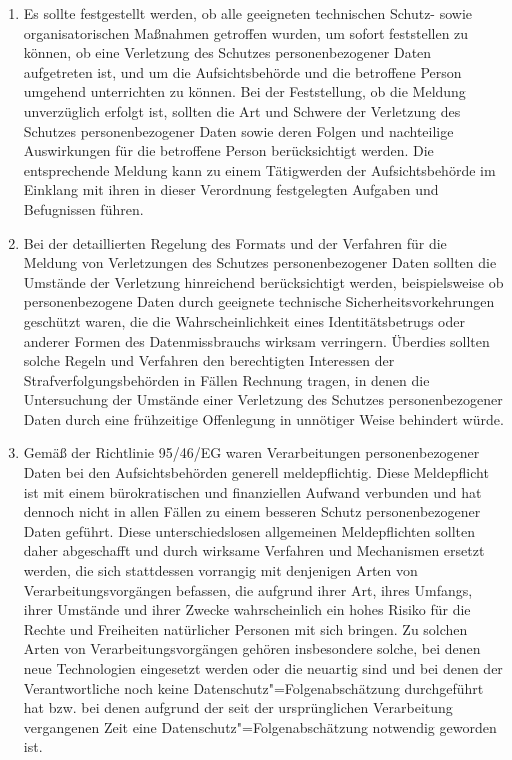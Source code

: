 \begin{enumerate}

   \item Es sollte festgestellt werden, ob alle geeigneten technischen Schutz- sowie organisatorischen Maßnahmen
    getroffen wurden, um sofort feststellen zu können, ob eine Verletzung des Schutzes personenbezogener Daten
    aufgetreten ist, und um die Aufsichtsbehörde und die betroffene Person umgehend unterrichten zu können. Bei der
    Feststellung, ob die Meldung unverzüglich erfolgt ist, sollten die Art und Schwere der Verletzung des Schutzes
    personenbezogener Daten sowie deren Folgen und nachteilige Auswirkungen für die betroffene Person berücksichtigt
    werden. Die entsprechende Meldung kann zu einem Tätigwerden der Aufsichtsbehörde im Einklang mit ihren in dieser
    Verordnung festgelegten Aufgaben und Befugnissen führen.%
   \label{eg:87}
   

   \item Bei der detaillierten Regelung des Formats und der Verfahren für die Meldung von Verletzungen des Schutzes
    personenbezogener Daten sollten die Umstände der Verletzung hinreichend berücksichtigt werden, beispielsweise ob
    personenbezogene Daten durch geeignete technische Sicherheitsvorkehrungen geschützt waren, die die
    Wahrscheinlichkeit eines Identitätsbetrugs oder anderer Formen des Datenmissbrauchs wirksam verringern. Überdies
    sollten solche Regeln und Verfahren den berechtigten Interessen der Strafverfolgungsbehörden in Fällen Rechnung
    tragen, in denen die Untersuchung der Umstände einer Verletzung des Schutzes personenbezogener Daten durch eine
    frühzeitige Offenlegung in unnötiger Weise behindert würde.%
   \label{eg:88}
   

   \item Gemäß der Richtlinie 95/46/EG waren Verarbeitungen personenbezogener Daten bei den Aufsichtsbehörden generell
    meldepflichtig. Diese Meldepflicht ist mit einem bürokratischen und finanziellen Aufwand verbunden und hat dennoch
    nicht in allen Fällen zu einem besseren Schutz personenbezogener Daten geführt. Diese unterschiedslosen allgemeinen
    Meldepflichten sollten daher abgeschafft und durch wirksame Verfahren und Mechanismen ersetzt werden, die sich
    stattdessen vorrangig mit denjenigen Arten von Verarbeitungsvorgängen befassen, die aufgrund ihrer Art, ihres
    Umfangs, ihrer Umstände und ihrer Zwecke wahrscheinlich ein hohes Risiko für die Rechte und Freiheiten natürlicher
    Personen mit sich bringen. Zu solchen Arten von Verarbeitungsvorgängen gehören insbesondere solche, bei denen neue
    Technologien eingesetzt werden oder die neuartig sind und bei denen der Verantwortliche noch keine
    Datenschutz"=Folgenabschätzung durchgeführt hat bzw. bei denen aufgrund der seit der ursprünglichen Verarbeitung
    vergangenen Zeit eine Datenschutz"=Folgenabschätzung notwendig geworden ist.%
   \label{eg:89}
   

\end{enumerate}
